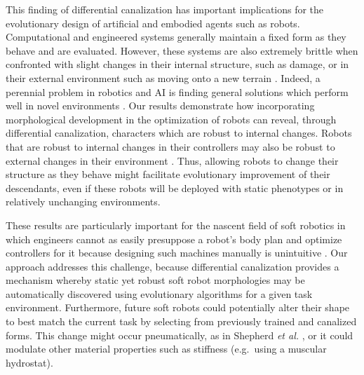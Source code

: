 This finding of differential canalization has important implications for the evolutionary design of artificial and embodied agents such as robots.
Computational and engineered systems generally maintain a fixed form as they behave and are evaluated.
However, these systems are also extremely brittle when confronted with slight changes in their internal structure, such as damage, 
or in their external environment such as moving onto a new terrain
\cite{french1999catastrophic,
carlson2005ugvs,
bongard2006resilient}.
Indeed, a perennial problem in robotics and AI is finding general solutions which perform well in novel environments 
\cite{koos2013transferability,
nguyen2015deep
}.
Our results demonstrate how incorporating morphological development in the optimization of robots can reveal, through differential canalization, characters which are robust to internal changes.
Robots that are robust to internal changes in their controllers may also be robust to external changes in their environment \cite{bongard2011morphological}.
Thus, allowing robots to change their structure as they behave might facilitate evolutionary improvement of their descendants, even if these robots will be deployed with static phenotypes or in relatively unchanging environments.

These results are particularly important for the nascent field of soft robotics in which engineers cannot as easily presuppose a robot's body plan and optimize controllers for it because designing such machines manually is unintuitive
\cite{lipson2014challenges, pfeifer2012challenges}.
Our approach addresses this challenge, because differential canalization provides a mechanism whereby static yet robust soft robot morphologies may be automatically discovered using evolutionary algorithms for a given task environment.
Furthermore, future soft robots could potentially alter their shape to best match the current task by selecting from previously trained and canalized forms.
This change might occur pneumatically, as in Shepherd \textit{et al.} \cite{shepherd2011multigait}, or it could modulate other material properties such as stiffness (e.g.~using a muscular hydrostat).

